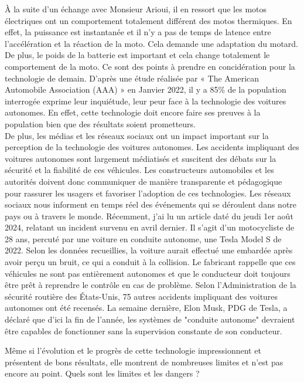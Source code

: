À la suite d’un échange avec Monsieur Arioui, il en ressort que les motos électriques ont un comportement totalement différent des motos thermiques. En effet, la puissance est instantanée et il n'y a pas de temps de latence entre l'accélération et la réaction de la moto. Cela demande une adaptation du motard. De plus, le poids de la batterie est important et cela change totalement le comportement de la moto. Ce sont des points à prendre en concidération pour la technologie de demain.
\vspace{0.5cm} %
D'après une étude réalisée par « The American Automobile Association (AAA) »\cite{consumer_skepticim} en Janvier 2022, il y a 85\% de la population interrogée exprime leur inquiétude, leur peur face à la technologie des voitures autonomes. En effet, cette technologie doit encore faire ses preuves à la population bien que des résultats soient prometteurs.\\
De plus, les médias et les réseaux sociaux ont un impact important sur la perception de la technologie des voitures autonomes. Les accidents impliquant des voitures autonomes sont largement médiatisés et suscitent des débats sur la sécurité et la fiabilité de ces véhicules. Les constructeurs automobiles et les autorités doivent donc communiquer de manière transparente et pédagogique pour rassurer les usagers et favoriser l’adoption de ces technologies.
Les réseaux sociaux nous informent en temps réel des événements qui se déroulent dans notre pays ou à travers le monde. 
Récemment, j'ai lu un article\cite{journal_de_quebec_motocycliste_nodate} daté du jeudi 1er août 2024, relatant un incident survenu en avril dernier. Il s'agit d'un motocycliste de 28 ans, percuté par une voiture en conduite autonome, une Tesla Model S de 2022. Selon les données recueillies, la voiture aurait effectué une embardée après avoir perçu un bruit, ce qui a conduit à la collision. Le fabricant rappelle que ces véhicules ne sont pas entièrement autonomes et que le conducteur doit toujours être prêt à reprendre le contrôle en cas de problème. Selon l'Administration de la sécurité routière des États-Unis, 75 autres accidents impliquant des voitures autonomes ont été recensés. 
La semaine dernière, Elon Musk, PDG de Tesla, a déclaré que d'ici la fin de l'année, les systèmes de "conduite autonome" devraient être capables de fonctionner sans la supervision constante de son conducteur.

\vspace{0.5cm} %
Même si l'évolution et le progrès de cette technologie impressionnent et présentent de bons résultats, elle montrent de nombreuses limites et n'est pas encore au point. Quels sont les limites et les dangers ?\\
\newpage

